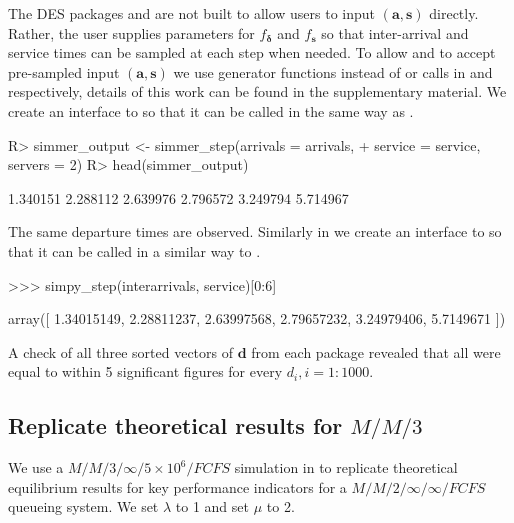 \documentclass[article]{jss}
\begin{document}
%
The DES packages  and  are not built to allow
users to input $(\mathbf{a,s})$ directly. Rather, the user supplies
parameters for $f_{\boldsymbol{\delta}}$ and $f_{\mathbf{s}}$ so that inter-arrival
and service times can be sampled at each step when needed. To allow
 and  to accept pre-sampled input
$(\mathbf{a,s})$ we use generator functions instead of
 or  calls in
 and  respectively, details of this work
can be found in the supplementary material. We create an interface to
 so that it can be called in the same way as
.
%
\begin{CodeChunk}
\begin{Sinput}
R> simmer_output <- simmer_step(arrivals = arrivals, 
+    service = service, servers = 2)
R> head(simmer_output)
\end{Sinput}
\begin{Soutput}
[1] 1.340151 2.288112 2.639976 2.796572 3.249794 5.714967
\end{Soutput}
\end{CodeChunk}
%
The same departure times are observed. Similarly in 
we create an interface to  so that it can be called in a
similar way to .
%
\begin{CodeChunk}
\begin{CodeInput}
>>> simpy_step(interarrivals, service)[0:6]
\end{CodeInput}
\begin{CodeOutput}
array([ 1.34015149,  2.28811237,  2.63997568,  2.79657232,  3.24979406, 
	5.7149671 ])
\end{CodeOutput}
\end{CodeChunk}
%
A check of all three sorted vectors of $\mathbf{d}$ from each package
revealed that all were equal to within 5 significant figures for every
$d_i, i = 1:1000$.

\subsection[Replicate theoretical results for M/M/3]{Replicate theoretical results for $M/M/3$}

We use a $M/M/3/\infty/5 \times 10^6/\mathit{FCFS}$ simulation in
 to replicate theoretical equilibrium results for
key performance indicators for a $M/M/2/\infty/\infty/\mathit{FCFS}$ queueing
system. We set $\lambda$ to 1 and set $\mu$ to 2.
\end{document}
